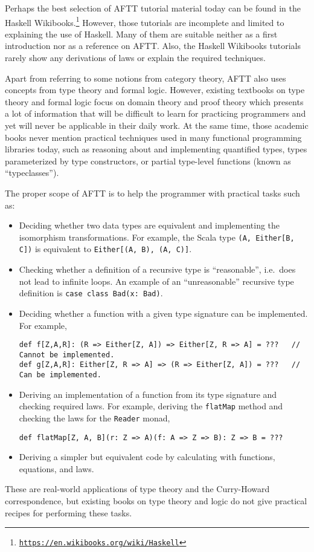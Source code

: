 Perhaps the best selection of AFTT tutorial material today can be
found in the Haskell Wikibooks.\footnote{\texttt{\href{https://en.wikibooks.org/wiki/Haskell}{https://en.wikibooks.org/wiki/Haskell}}}
However, those tutorials are incomplete and limited to explaining
the use of Haskell. Many of them are suitable neither as a first introduction
nor as a reference on AFTT. Also, the Haskell Wikibooks tutorials
rarely show any derivations of laws or explain the required techniques.

Apart from referring to some notions from category theory, AFTT also
uses concepts from type theory and formal logic. However, existing
textbooks on type theory and formal logic focus on domain theory and
proof theory \textemdash{} which presents a lot of information that
will be difficult to learn for practicing programmers and yet will
never be applicable in their daily work. At the same time, those academic
books never mention practical techniques used in many functional programming
libraries today, such as reasoning about and implementing quantified
types, types parameterized by type constructors, or partial type-level
functions (known as \textsf{``}typeclasses\textsf{''}).

The proper scope of AFTT is to help the programmer with practical
tasks such as:
\begin{itemize}
\item Deciding whether two data types are equivalent and implementing the
isomorphism transformations. For example, the Scala type \lstinline!(A, Either[B, C])!
is equivalent to \lstinline!Either[(A, B), (A, C)]!.
\item Checking whether a definition of a recursive type is \textsf{``}reasonable\textsf{''},
i.e.~does not lead to infinite loops. An example of an \textsf{``}unreasonable\textsf{''}
recursive type definition is \lstinline!case class Bad(x: Bad)!.
\item Deciding whether a function with a given type signature can be implemented.
For example, 
\begin{lstlisting}
def f[Z,A,R]: (R => Either[Z, A]) => Either[Z, R => A] = ???   // Cannot be implemented.
def g[Z,A,R]: Either[Z, R => A] => (R => Either[Z, A]) = ???   // Can be implemented.
\end{lstlisting}
\item Deriving an implementation of a function from its type signature and
checking required laws. For example, deriving the \lstinline!flatMap!
method and checking the laws for the \lstinline!Reader! monad,
\begin{lstlisting}
def flatMap[Z, A, B](r: Z => A)(f: A => Z => B): Z => B = ???
\end{lstlisting}
\item Deriving a simpler but equivalent code by calculating with functions,
equations, and laws.
\end{itemize}
These are real-world applications of type theory and the Curry-Howard
correspondence, but existing books on type theory and logic do not
give practical recipes for performing these tasks.

